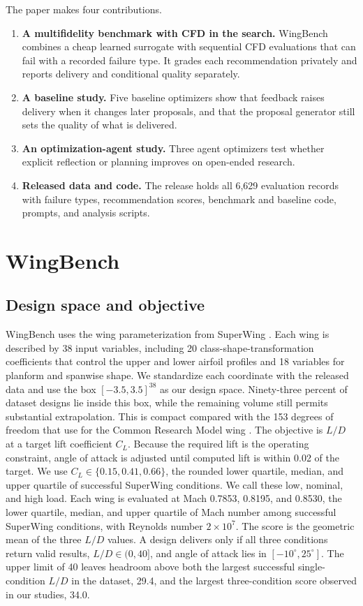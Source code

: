 \documentclass{article} %
\newcommand{\UnifiedCFDObserved}{6{,}629}
\newcommand{\CampaignMaxLd}{34.0}
\begin{document}
The paper makes four contributions.
\begin{enumerate}
\item \textbf{A multifidelity benchmark with CFD in the search.} WingBench combines a
cheap learned surrogate with sequential CFD evaluations that can fail with a
recorded failure type. It grades each
recommendation privately and reports delivery and conditional quality
separately.
\item \textbf{A baseline study.} Five baseline optimizers show that feedback
raises delivery when it changes later proposals, and that the proposal
generator still sets the quality of what is delivered.
\item \textbf{An optimization-agent study.} Three agent optimizers test whether
explicit reflection or planning improves on open-ended research.
\item \textbf{Released data and code.} The release holds all
\UnifiedCFDObserved{} evaluation records with failure types, recommendation
scores, benchmark and baseline code, prompts, and analysis scripts.
\end{enumerate}

\section{WingBench}
\label{sec:benchmark}

\subsection{Design space and objective}

WingBench uses the wing parameterization from SuperWing
\citep{yang2026superwing}. Each wing is
described by 38 input variables, including 20 class-shape-transformation
coefficients that control the upper and lower airfoil profiles
\citep{kulfan2008universal} and
18 variables for planform and spanwise shape. We standardize each coordinate
with the released data and use the box $[-3.5,3.5]^{38}$ as our design space. Ninety-three percent
of dataset designs lie inside this box, while the remaining volume still
permits substantial extrapolation. This is compact compared with the 153
degrees of freedom that \citet{yang2026aerotransformer} use for the Common
Research Model wing \citep{vassberg2008crm}.
The objective is $L/D$ at a target lift coefficient $C_L$. Because the required
lift is the operating constraint, angle of attack is adjusted until computed
lift is within 0.02 of the target. We use $C_L\in\{0.15,0.41,0.66\}$, the rounded
lower quartile, median, and upper quartile of successful SuperWing conditions.
We call these low, nominal, and high load. Each wing is evaluated at Mach
0.7853, 0.8195, and 0.8530, the lower quartile, median, and upper quartile of
Mach number among successful SuperWing conditions, with Reynolds number
$2\times10^7$. The score is the
geometric mean of the three $L/D$ values. A design delivers only if all three
conditions return valid results, $L/D\in(0,40]$, and angle of attack lies in
$[-10^\circ,25^\circ]$. The upper limit of 40 leaves headroom above
both the largest successful single-condition $L/D$ in the dataset,
29.4, and the largest three-condition score observed in our studies,
\CampaignMaxLd{}.
\end{document}
